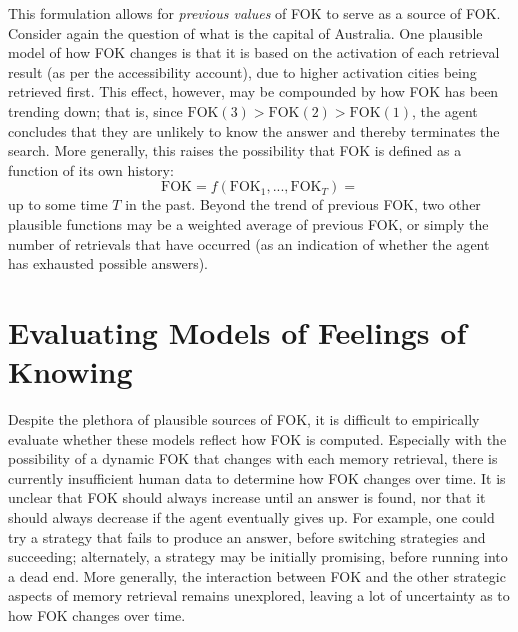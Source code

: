 \documentclass[10pt,letterpaper]{article}
\newcommand{\comment}[1]{}
\newcommand{\fok}[0]{\text{FOK}}
\begin{document}
This formulation allows for \emph{previous values} of FOK to serve as a source of FOK.
Consider again the question of what is the capital of Australia. %
One plausible model of how FOK changes is that it is based on the activation of each retrieval result (as per the accessibility account), due to higher activation cities being retrieved first.
This effect, however, may be compounded by how FOK has been trending down; that is, since $\fok(3) > \fok(2) > \fok(1)$, the agent concludes that they are unlikely to know the answer and thereby terminates the search.
More generally, this raises the possibility that FOK is defined as a function of its own history:
$$\fok = f(\fok_1, ..., \fok_T) = $$
up to some time $T$ in the past.
Beyond the trend of previous FOK, two other plausible functions may be a weighted average of previous FOK, or simply the number of retrievals that have occurred (as an indication of whether the agent has exhausted possible answers).


\comment{
    mathematical pitfalls
        repeated retrievals will boost activation; 
    the impact of "unrelated" retrievals/inferences
    any modeling issues?
}


\section{Evaluating Models of Feelings of Knowing}

% 
Despite the plethora of plausible sources of FOK, it is difficult to empirically evaluate whether these models reflect how FOK is computed.
Especially with the possibility of a dynamic FOK that changes with each memory retrieval, there is currently insufficient human data to determine how FOK changes over time.
It is unclear that FOK should always increase until an answer is found, nor that it should always decrease if the agent eventually gives up.
For example, one could try a strategy that fails to produce an answer, before switching strategies and succeeding; alternately, a strategy may be initially promising, before running into a dead end.
More generally, the interaction between FOK and the other strategic aspects of memory retrieval remains unexplored, leaving a lot of uncertainty as to how FOK changes over time.
\end{document}
